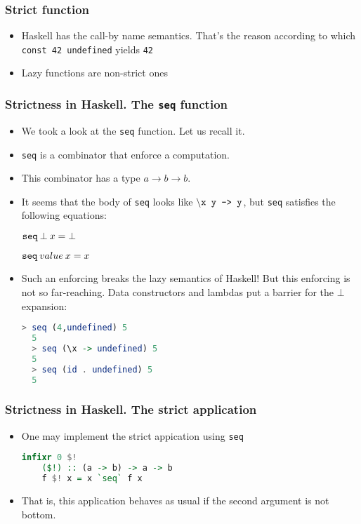 \documentclass[10pt,pdf,utf8,russian,aspectratio=169]{beamer}
\begin{document}
\begin{frame}
  \frametitle{Strict function}
  \begin{itemize}
    \item Haskell has the call-by name semantics. That's the reason according to which \verb"const 42 undefined" yields \verb"42"
    \item Lazy functions are non-strict ones
  \end{itemize}
\end{frame}

\begin{frame}[fragile]
  \frametitle{Strictness in Haskell. The \verb"seq" function}
\begin{itemize}
  \item We took a look at the \verb"seq" function. Let us recall it.
  \item \verb"seq" is a combinator that enforce a computation.
  \item This combinator has a type $a \to b \to b$.
  \item It seems that the body of \verb"seq" looks like $\setminus\verb"x y -> y"$, but \verb"seq" satisfies the following equations:
  \begin{center}
    $\verb"seq" \: \bot \: x = \bot$

    $\verb"seq" \: value \: x = x$
  \end{center}
  \item Such an enforcing breaks the lazy semantics of Haskell! But this enforcing is not so far-reaching. Data constructors and lambdas put a barrier for the $\bot$ expansion:
  \begin{lstlisting}[language=Haskell]
  > seq (4,undefined) 5
  5
  > seq (\x -> undefined) 5
  5
  > seq (id . undefined) 5
  5
  \end{lstlisting}
\end{itemize}
\end{frame}

\begin{frame}[fragile]
  \frametitle{Strictness in Haskell. The strict application}
  \begin{itemize}
    \item One may implement the strict appication using \verb"seq"
    \begin{lstlisting}[language=Haskell]
    infixr 0 $!
    ($!) :: (a -> b) -> a -> b
    f $! x = x `seq` f x
    \end{lstlisting}
    \item That is, this application behaves as usual if the second argument is not bottom.
  \end{itemize}
\end{frame}
\end{document}
